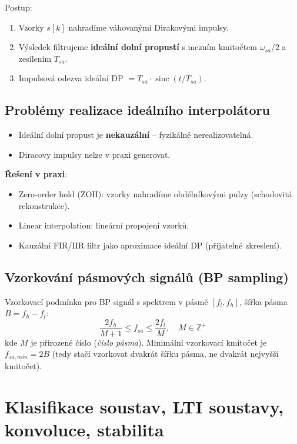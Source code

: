 \documentclass[12pt,a4paper]{article}
\newcommand{\sinc}{\operatorname{sinc}}
\begin{document}
Postup:
\begin{enumerate}
  \item Vzorky $s[k]$ nahradíme váhovanými Dirakovými impulsy.
  \item Výsledek filtrujeme \textbf{ideální dolní propustí} s mezním kmitočtem $\omega_{sa}/2$ a zesílením $T_{sa}$.
  \item Impulsová odezva ideální DP $= T_{sa}\cdot\sinc(t/T_{sa})$.
\end{enumerate}

\subsection*{Problémy realizace ideálního interpolátoru}

\begin{itemize}
  \item Ideální dolní propust je \textbf{nekauzální} – fyzikálně nerealizovatelná.
  \item Diracovy impulsy nelze v praxi generovat.
\end{itemize}

\textbf{Řešení v praxi}:
\begin{itemize}
  \item Zero-order hold (ZOH): vzorky nahradíme obdélníkovými pulzy (schodovitá rekonstrukce).
  \item Linear interpolation: lineární propojení vzorků.
  \item Kauzální FIR/IIR filtr jako aproximace ideální DP (přijatelné zkreslení).
\end{itemize}

\subsection*{Vzorkování pásmových signálů (BP sampling)}

Vzorkovací podmínka pro BP signál s spektrem v pásmě $[f_l, f_h]$, šířka pásma $B = f_h - f_l$:
\[
  \frac{2f_h}{M+1} \leq f_{sa} \leq \frac{2f_l}{M}, \quad M \in \mathbb{Z}^+
\]
kde $M$ je přirozené číslo (\emph{číslo pásma}). Minimální vzorkovací kmitočet je $f_{sa,min} = 2B$ (tedy stačí vzorkovat dvakrát šířku pásma, ne dvakrát nejvyšší kmitočet).

\newpage
\section{Klasifikace soustav, LTI soustavy, konvoluce, stabilita}
\end{document}
